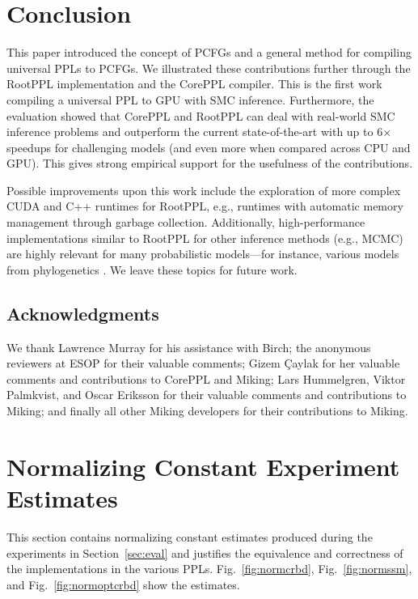 \documentclass[runningheads]{llncs}
\begin{document}
\section{Conclusion}\label{sec:conclude}
This paper introduced the concept of PCFGs and a general method for compiling universal PPLs to PCFGs.
We illustrated these contributions further through the RootPPL implementation and the CorePPL compiler.
This is the first work compiling a universal PPL to GPU with SMC inference.
Furthermore, the evaluation showed that CorePPL and RootPPL can deal with real-world SMC inference problems and outperform the current state-of-the-art with up to 6$\times$ speedups for challenging models (and even more when compared across CPU and GPU).
This gives strong empirical support for the usefulness of the contributions.

Possible improvements upon this work include the exploration of more complex CUDA and C++ runtimes for RootPPL, e.g., runtimes with automatic memory management through garbage collection.
Additionally, high-performance implementations similar to RootPPL for other inference methods (e.g., MCMC) are highly relevant for many probabilistic models---for instance, various models from phylogenetics \cite{ronquist2021universal}.
We leave these topics for future work.

\subsection*{Acknowledgments}
We thank Lawrence Murray for his assistance with Birch; the anonymous reviewers at ESOP for their valuable comments; Gizem Çaylak for her valuable comments and contributions to CorePPL and Miking; Lars Hummelgren, Viktor Palmkvist, and Oscar Eriksson for their valuable comments and contributions to Miking; and finally all other Miking developers for their contributions to Miking.

\clearpage


% 


\ifextended
\clearpage
\appendix

\section{Normalizing Constant Experiment Estimates}\label{sec:normconst}
This section contains normalizing constant estimates produced during the experiments in Section~\ref{sec:eval} and justifies the equivalence and correctness of the implementations in the various PPLs.
Fig.~\ref{fig:normcrbd}, Fig.~\ref{fig:normssm}, and Fig.~\ref{fig:normoptcrbd} show the estimates.
\end{document}
